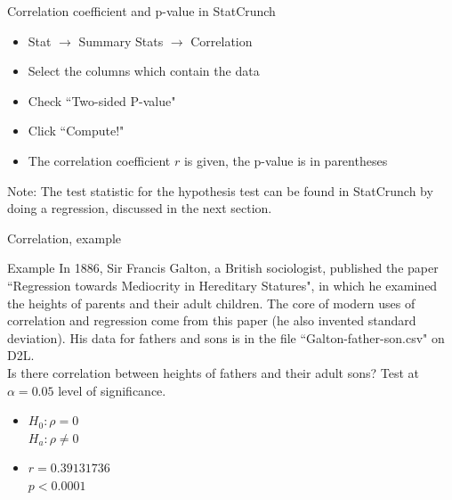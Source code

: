 \documentclass[xcolor=table]{beamer}
\begin{document}
\begin{frame}{Correlation coefficient and p-value in StatCrunch}
\begin{block}{}
\begin{itemize}
\item Stat $\to$ Summary Stats $\to$ Correlation
\item Select the columns which contain the data
\item Check ``Two-sided P-value"
\item Click ``Compute!"
\item The correlation coefficient $r$ is given, the p-value is in parentheses
\end{itemize} 
\end{block}
\begin{block}{}
Note: The test statistic for the hypothesis test can be found in StatCrunch by doing a regression, discussed in the next section. 
\end{block}
\end{frame}

\begin{frame}{Correlation, example}
\begin{exampleblock}{Example}
In 1886, Sir Francis Galton, a British sociologist, published the paper ``Regression towards Mediocrity in Hereditary Statures", in which he examined the heights of parents and their adult children. The core of modern uses of correlation and regression come from this paper (he also invented standard deviation). His data for fathers and sons is in the file ``Galton-father-son.csv" on D2L.\\
\medskip
Is there correlation between heights of fathers and their adult sons? Test at $\alpha = 0.05$ level of significance.
\begin{itemize}
\pause\item $H_0: \rho = 0$\\$H_a: \rho \ne 0$ 
\pause\item $r = 0.39131736$ \\ $p < 0.0001$
\end{itemize} 
\end{exampleblock}
\end{frame}
\end{document}
